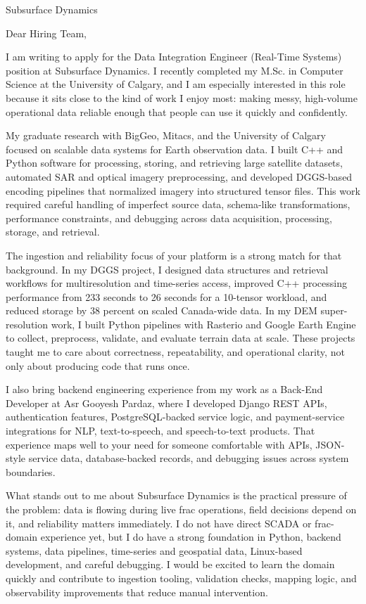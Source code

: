 \documentclass[11pt]{letter}
\begin{document}
\begin{letter}{Subsurface Dynamics}

\opening{Dear Hiring Team,}

I am writing to apply for the Data Integration Engineer (Real-Time Systems) position at Subsurface Dynamics. I recently completed my M.Sc. in Computer Science at the University of Calgary, and I am especially interested in this role because it sits close to the kind of work I enjoy most: making messy, high-volume operational data reliable enough that people can use it quickly and confidently.

My graduate research with BigGeo, Mitacs, and the University of Calgary focused on scalable data systems for Earth observation data. I built C++ and Python software for processing, storing, and retrieving large satellite datasets, automated SAR and optical imagery preprocessing, and developed DGGS-based encoding pipelines that normalized imagery into structured tensor files. This work required careful handling of imperfect source data, schema-like transformations, performance constraints, and debugging across data acquisition, processing, storage, and retrieval.

The ingestion and reliability focus of your platform is a strong match for that background. In my DGGS project, I designed data structures and retrieval workflows for multiresolution and time-series access, improved C++ processing performance from 233 seconds to 26 seconds for a 10-tensor workload, and reduced storage by 38 percent on scaled Canada-wide data. In my DEM super-resolution work, I built Python pipelines with Rasterio and Google Earth Engine to collect, preprocess, validate, and evaluate terrain data at scale. These projects taught me to care about correctness, repeatability, and operational clarity, not only about producing code that runs once.

I also bring backend engineering experience from my work as a Back-End Developer at Asr Gooyesh Pardaz, where I developed Django REST APIs, authentication features, PostgreSQL-backed service logic, and payment-service integrations for NLP, text-to-speech, and speech-to-text products. That experience maps well to your need for someone comfortable with APIs, JSON-style service data, database-backed records, and debugging issues across system boundaries.

What stands out to me about Subsurface Dynamics is the practical pressure of the problem: data is flowing during live frac operations, field decisions depend on it, and reliability matters immediately. I do not have direct SCADA or frac-domain experience yet, but I do have a strong foundation in Python, backend systems, data pipelines, time-series and geospatial data, Linux-based development, and careful debugging. I would be excited to learn the domain quickly and contribute to ingestion tooling, validation checks, mapping logic, and observability improvements that reduce manual intervention.


\end{letter}
\end{document}
